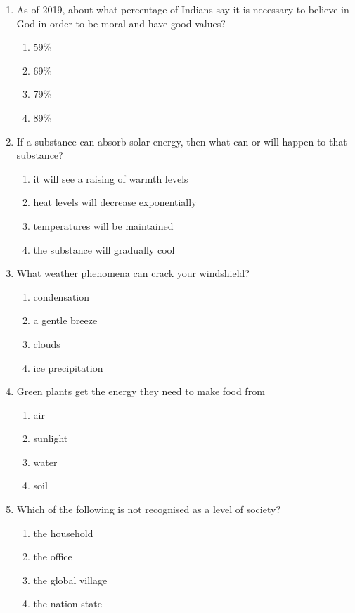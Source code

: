 \documentclass[12pt]{article}
\begin{document}
\begin{enumerate}[label=\arabic*.]
\begin{enumerate}[label=(\alph*)]
    \item endocrine
    \item circulatory
    \item respiratory
    \item integumentary
\end{enumerate}
\item As of 2019, about what percentage of Indians say it is necessary to believe in God in order to be moral and have good values?
\begin{enumerate}[label=(\alph*)]
    \item 59\%
    \item 69\%
    \item 79\%
    \item 89\%
\end{enumerate}
\item If a substance can absorb solar energy, then what can or will happen to that substance?
\begin{enumerate}[label=(\alph*)]
    \item it will see a raising of warmth levels
    \item heat levels will decrease exponentially
    \item temperatures will be maintained
    \item the substance will gradually cool
\end{enumerate}
\item What weather phenomena can crack your windshield?
\begin{enumerate}[label=(\alph*)]
    \item condensation
    \item a gentle breeze
    \item clouds
    \item ice precipitation
\end{enumerate}
\item Green plants get the energy they need to make food from
\begin{enumerate}[label=(\alph*)]
    \item air
    \item sunlight
    \item water
    \item soil
\end{enumerate}
\item Which of the following is not recognised as a level of society?
\begin{enumerate}[label=(\alph*)]
    \item the household
    \item the office
    \item the global village
    \item the nation state
\end{enumerate}
\end{enumerate}
\end{document}
